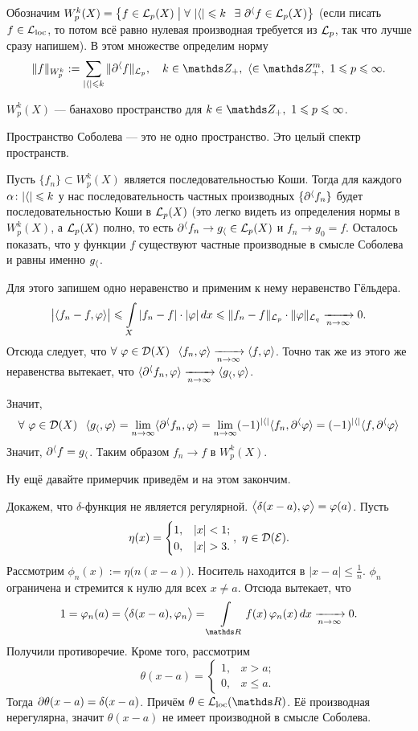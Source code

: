 Обозначим $W_p^k(X) = \big\{f\in\mathcal L_p(X)\bigm|\forall\ |\langle|\leqslant k\hskip .75em plus.1em minus.08em\relax \exists\ \partial^\langle f\in\mathcal L_p(X)\big\}$ (если писать $f\in\mathcal L_{\mathrm{loc}}$, то потом всё равно нулевая производная требуется из $\mathcal L_p$, так что лучше сразу напишем). В этом множестве определим норму
\[
  \|f\|_{W_p^k}:=\sum\limits_{|\a|\le k}\|\dl^\a f\|_{\L_p},\quad k\in\Z_+,\ \a\in\Z_+^m,\ 1\le p\le \infty.
\]
\begin{The}
	$W_p^k(X)$ --- банахово пространство для $k\in\Z_+,\ 1\le p\le \infty$.
\end{The}
Пространство Соболева --- это не одно пространство. Это целый спектр пространств.
\begin{Proof}
	Пусть $\{f_n\}\subset W_p^k(X)$ является последовательностью Коши. Тогда для каждого $\alpha\colon |\langle|\leqslant k$ у нас последовательность частных производных $\{\partial^\langle f_n\}$ будет последовательностью Коши в $\mathcal L_p(X)$ (это легко видеть из определения нормы в $W_p^k(X)$, а $\mathcal L_p(X)$ полно, то есть $\partial^\langle f_n\rightarrow g_\langle\in\mathcal L_p(X)$ и $f_n\to g_0=f$. Осталось показать, что у функции $f$ существуют частные производные в смысле Соболева и равны именно $g_\langle$.

	Для этого запишем одно неравенство и применим к нему неравенство Гёльдера.
\[
  \big|\langle f_n-f,\varphi\rangle\big|\leqslant \int\limits_{X}|f_n-f|\cdot|\varphi|\,dx\leqslant 
  \|f_n-f\|_{\mathcal L_p}\cdot \|\varphi\|_{\mathcal L_q}\xrightarrow[n\rightarrow\infty]{}0.
\]
Отсюда следует, что $\forall\ \varphi\in \mathcal D(X)\hskip .75em plus.1em minus.08em\relax \langle f_n,\varphi\rangle\xrightarrow[n\rightarrow\infty]{}\langle f,\varphi\rangle$. Точно так же из этого же неравенства вытекает, что $\langle \partial^\langle f_n,\varphi\rangle\xrightarrow[n\rightarrow\infty]{} \langle g_\langle,\varphi\rangle$.

Значит,
\[
  \forall\ \varphi\in \mathcal D(X)\hskip .75em plus.1em minus.08em\relax \langle g_\langle,\varphi\rangle = \lim\limits_{n\rightarrow\infty} \langle\partial^\langle f_n,\varphi\rangle = 
  \lim\limits_{n\rightarrow\infty} (-1)^{|\langle|}\langle f_n,\partial^\langle\varphi\rangle = 
  (-1)^{|\langle|}\langle f,\partial^\langle\varphi\rangle
\]
Значит, $\partial^\langle f = g_\langle$. Таким образом $f_n\to f$ в $W_p^k(X)$.
\end{Proof}
Ну ещё давайте примерчик приведём и на этом закончим.

Докажем, что $\delta$-функция не является регулярной. $\big\langle\delta(x-a),\varphi\big\rangle = \varphi(a)$. Пусть 
\[
	\eta(x) = \begin{cases}
		1,&|x|<1;\\
		0,&|x|>3.
	\end{cases},\ \eta\in\D(\E).
\]
Рассмотрим $\phi_n(x):=\eta\big(n(x-a)\big)$. Носитель находится в $|x-a|\le\frac1n$. $\phi_n$ ограничена и стремится к нулю для всех $x\ne a$. Отсюда вытекает, что\[
  1 = \phi_n(a) = \big\la \delta(x-a),\phi_n\big\ra = 
  \Gint{\R}f(x)\,\phi_n(x)\,dx\te 0.
\]
Получили противоречие. Кроме того, рассмотрим
\[
  \theta(x-a) = \begin{cases}
	  1,&x>a;\\
	  0,&x\le a.
  \end{cases}
\]
Тогда $\partial \theta(x-a) = \delta(x-a)$. Причём $\theta\in \Lloc(\R)$. Её производная нерегулярна, значит $\theta(x-a)$ не имеет производной в смысле Соболева.
